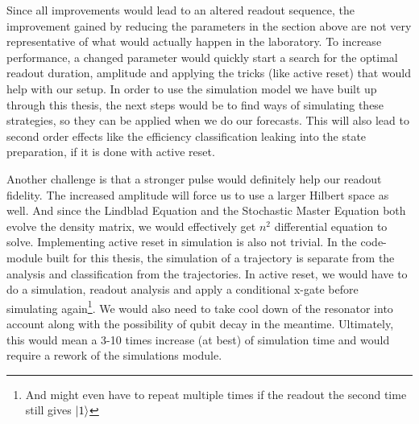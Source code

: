 Since all improvements would lead to an altered readout sequence, the improvement gained by reducing the parameters in the section above are not very representative of what would actually happen in the laboratory. To increase performance, a changed parameter would quickly start a search for the optimal readout duration, amplitude and applying the tricks (like active reset) that would help with our setup. In order to use the simulation model we have built up through this thesis, the next steps would be to find ways of simulating these strategies, so they can be applied when we do our forecasts. This will also lead to second order effects like the efficiency classification leaking into the state preparation, if it is done with active reset.

Another challenge is that a stronger pulse would definitely help our readout fidelity. The increased amplitude will force us to use a larger Hilbert space as well. And since the Lindblad Equation and the Stochastic Master Equation both evolve the density matrix, we would effectively get $n^2$ differential equation to solve. Implementing active reset in simulation is also not trivial. In the code-module built for this thesis, the simulation of a trajectory is separate from the analysis and classification from the trajectories. In active reset, we would have to do a simulation, readout analysis and apply a conditional x-gate  before simulating again\footnote{And might even have to repeat multiple times if the readout the second time still gives $\ket{1}$}. We would also need to take cool down of the resonator into account along with the possibility of qubit decay in the meantime.  Ultimately, this would mean a 3-10 times increase  (at best)  of simulation time and would require a rework of the simulations module.